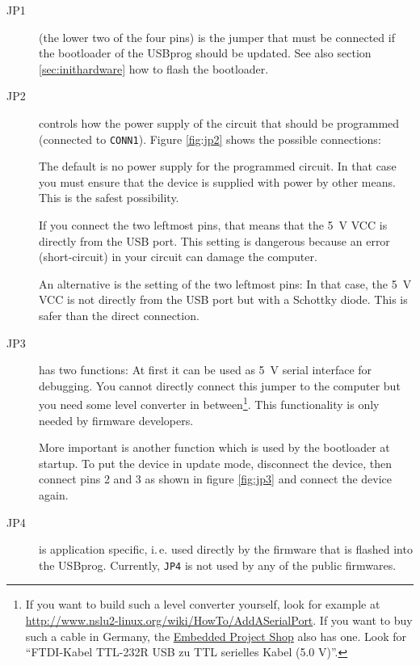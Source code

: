 \documentclass[bibtotoc,UKenglish,halfparskip,oneside,DIV12]{scrreprt}
\begin{document}
\begin{description}
  \item[JP1] (the lower two of the four pins) is the jumper that must be connected if the bootloader
    of the USBprog should be updated. See also section \vref{sec:inithardware} how to flash the
    bootloader.

  \item[JP2] controls how the power supply of the circuit that should be programmed (connected to
    \texttt{CONN1}). Figure \vref{fig:jp2} shows the possible connections:

    The default is no power supply for the programmed circuit. In that case you must ensure that the
    device is supplied with power by other means. This is the safest possibility.

    If you connect the two leftmost pins, that means that the 5~V VCC is directly from the USB port.
    This setting is dangerous because an error (short-circuit) in your circuit can damage the
    computer.

    An alternative is the setting of the two leftmost pins: In that case, the 5~V VCC is not
    directly from the USB port but with a Schottky diode. This is safer than the direct connection.

  \item[JP3] has two functions: At first it can be used as 5~V serial interface for debugging. You
    cannot directly connect this jumper to the computer but you need some level converter in
    between\footnote{If you want to build such a level converter yourself, look for example at
    \url{http://www.nslu2-linux.org/wiki/HowTo/AddASerialPort}. If you want to buy such a cable in
    Germany, the \href{http://www.eproo.net}{Embedded Project Shop} also has one. Look for
    ``FTDI-Kabel TTL-232R USB zu TTL serielles Kabel (5.0 V)''.}. This functionality is only needed
    by firmware developers.

    More important is another function which is used by the bootloader at startup. To put the device
    in update mode, disconnect the device, then connect pins 2 and 3 as shown in figure
    \vref{fig:jp3} and connect the device again.

  \item[JP4] is application specific, i.\,e. used directly by the firmware that is flashed into the
    USBprog. Currently, \texttt{JP4} is not used by any of the public firmwares.
\end{description}
\end{document}
